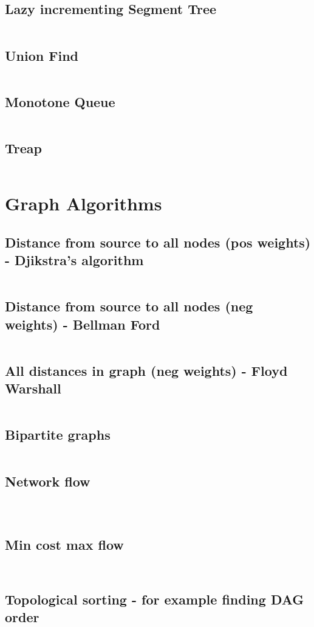 \documentclass[8pt,a4paper,landscape,oneside]{amsart}
\newcommand{\codej}[1]{\inputminted[fontsize=\large,tabsize=2,baselinestretch=1]{java}{code/#1}}
\newcommand{\codec}[1]{\inputminted[fontsize=\large,tabsize=2,baselinestretch=1]{cpp}{code/#1}}
\newcommand{\codep}[1]{\inputminted[fontsize=\large,tabsize=2,baselinestretch=1]{py}{code/#1}}
\begin{document}
\begin{multicols*}{2}
\begin{large}
\subsection{Lazy incrementing Segment Tree}
\codec{lazysgmtree2.cpp}
\subsection{Union Find}
\codep{unionfind.py}
\subsection{Monotone Queue}
\codep{monotonequeue.py}
\subsection{Treap}
\codec{Treap.cpp}
\section{Graph Algorithms}
\subsection{Distance from source to all nodes (pos weights) - Djikstra's algorithm}
\codep{djikstra.py}
\subsection{Distance from source to all nodes (neg weights) - Bellman Ford}
\codep{bellmanford.py}
\subsection{All distances in graph (neg weights) - Floyd Warshall}
\codep{floydwarshall.py}
\subsection{Bipartite graphs}
\codec{kuhns.cpp}
\subsection{Network flow}
\codec{dinic.cpp}
\codep{maxflow.py}
\codep{maxflow2.py}
\subsection{Min cost max flow}
\codep{mincostmaxflow.py}
\codej{mincostmaxflow.java}
\subsection{Topological sorting - for example finding DAG order}
\codep{topsort.py}

\end{large}
\end{multicols*}
\end{document}
